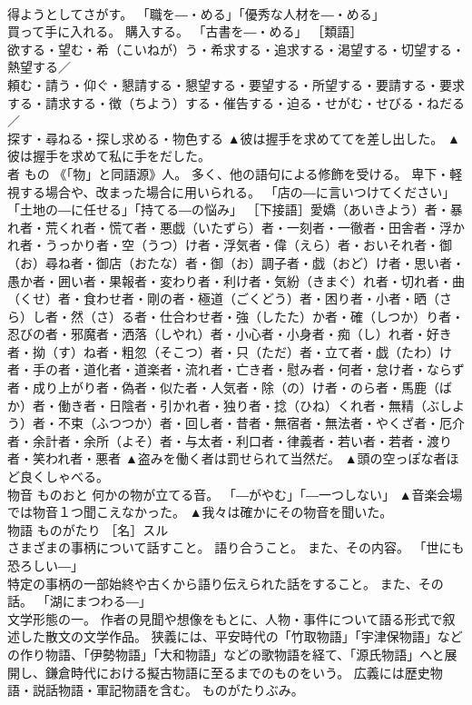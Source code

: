 \documentclass[8pt]{extreport}
\begin{document}
\begin{CJK}{UTF8}{min}
\\	得ようとしてさがす。 「職を―・める」「優秀な人材を―・める」 
\\	買って手に入れる。 購入する。 「古書を―・める」 ［類語］
\\	欲する・望む・希（こいねが）う・希求する・追求する・渇望する・切望する・熱望する／
\\	頼む・請う・仰ぐ・懇請する・懇望する・要望する・所望する・要請する・要求する・請求する・徴（ちよう）する・催告する・迫る・せがむ・せびる・ねだる／
\\	探す・尋ねる・探し求める・物色する	▲彼は握手を求めててを差し出した。 ▲彼は握手を求めて私に手をだした。
\\	者	もの	《「物」と同語源》人。 多く、他の語句による修飾を受ける。 卑下・軽視する場合や、改まった場合に用いられる。 「店の―に言いつけてください」「土地の―に任せる」「持てる―の悩み」 ［下接語］愛嬌（あいきよう）者・暴れ者・荒くれ者・慌て者・悪戯（いたずら）者・一刻者・一徹者・田舎者・浮かれ者・うっかり者・空（うつ）け者・浮気者・偉（えら）者・おいそれ者・御（お）尋ね者・御店（おたな）者・御（お）調子者・戯（おど）け者・思い者・愚か者・囲い者・果報者・変わり者・利け者・気紛（きまぐ）れ者・切れ者・曲（くせ）者・食わせ者・剛の者・極道（ごくどう）者・困り者・小者・晒（さら）し者・然（さ）る者・仕合わせ者・強（したた）か者・確（しつか）り者・忍びの者・邪魔者・洒落（しやれ）者・小心者・小身者・痴（し）れ者・好き者・拗（す）ね者・粗忽（そこつ）者・只（ただ）者・立て者・戯（たわ）け者・手の者・道化者・道楽者・流れ者・亡き者・慰み者・何者・怠け者・ならず者・成り上がり者・偽者・似た者・人気者・除（の）け者・のら者・馬鹿（ばか）者・働き者・日陰者・引かれ者・独り者・捻（ひね）くれ者・無精（ぶしよう）者・不束（ふつつか）者・回し者・昔者・無宿者・無法者・やくざ者・厄介者・余計者・余所（よそ）者・与太者・利口者・律義者・若い者・若者・渡り者・笑われ者・悪者	▲盗みを働く者は罰せられて当然だ。 ▲頭の空っぽな者ほど良くしゃべる。
\\	物音	ものおと	何かの物が立てる音。 「―がやむ」「―一つしない」	▲音楽会場では物音１つ聞こえなかった。 ▲我々は確かにその物音を聞いた。
\\	物語	ものがたり	［名］スル 
\\	さまざまの事柄について話すこと。 語り合うこと。 また、その内容。 「世にも恐ろしい―」 
\\	特定の事柄の一部始終や古くから語り伝えられた話をすること。 また、その話。 「湖にまつわる―」 
\\	文学形態の一。 作者の見聞や想像をもとに、人物・事件について語る形式で叙述した散文の文学作品。 狭義には、平安時代の「竹取物語」「宇津保物語」などの作り物語、「伊勢物語」「大和物語」などの歌物語を経て、「源氏物語」へと展開し、鎌倉時代における擬古物語に至るまでのものをいう。 広義には歴史物語・説話物語・軍記物語を含む。 ものがたりぶみ。 

\end{CJK}
\end{document}
